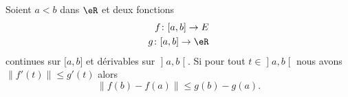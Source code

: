 \begin{proposition} \label{PropDQLhSoy}
    Soient \( a<b\) dans \( \eR\) et deux fonctions
    \begin{subequations}
        \begin{align}
            f\colon \mathopen[ a , b \mathclose]\to E\\
            g\colon \mathopen[ a , b \mathclose]\to \eR
        \end{align}
    \end{subequations}
    continues sur \( \mathopen[ a , b \mathclose]\) et dérivables sur \( \mathopen] a , b \mathclose[\). Si pour tout \( t\in\mathopen] a , b \mathclose[\) nous avons \( \| f'(t) \|\leq g'(t)\) alors
        \begin{equation}
            \| f(b)-f(a) \|\leq g(b)-g(a).
        \end{equation}
\end{proposition}

